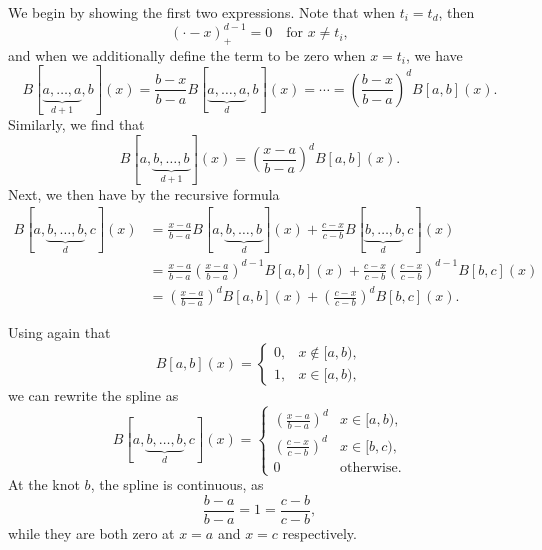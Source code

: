 \begin{solution}
    We begin by showing the first two expressions.
    Note that when $t_i = t_d$, then
    \begin{equation*}
        [t_i, \ldots, t_d](\cdot - x)_+^{d-1} = 0 \quad \text{for } x \neq t_i,
    \end{equation*}
    and when we additionally define the term to be zero when $x = t_i$, we have
    \begin{equation*}
        B[\underbrace{a, \ldots, a}_{d+1}, b](x) = \frac{b - x}{b - a} B[\underbrace{a, \ldots, a}_{d}, b](x) = \cdots =
        \left(\frac{b - x}{b - a}\right)^d B[a, b](x).
    \end{equation*}
    Similarly, we find that
    \begin{equation*}
        B[a, \underbrace{b, \ldots, b}_{d+1}](x) = \left(\frac{x - a}{b - a}\right)^d B[a, b](x).
    \end{equation*}
    Next, we then have by the recursive formula
    \begin{align*}
        B[a, \underbrace{b, \ldots, b}_{d}, c](x)
        &= \frac{x - a}{b - a} B[a, \underbrace{b, \ldots, b}_{d}](x) + \frac{c - x}{c - b} B[\underbrace{b, \ldots, b}_{d}, c](x) \\
        &= \frac{x - a}{b - a} \left( \frac{x - a}{b - a} \right)^{d-1} B[a, b](x) + \frac{c - x}{c - b} \left( \frac{c - x}{c - b} \right)^{d-1} B[b, c](x) \\
        &= \left(\frac{x - a}{b - a}\right)^{d} B[a, b](x) + \left(\frac{c - x}{c - b}\right)^{d} B[b, c](x).
    \end{align*}

    Using again that
    \begin{equation*}
        B[a, b](x) =
        \begin{cases}
            0, & x \notin [a, b), \\ %
            1, & x \in [a, b), %
        \end{cases}
    \end{equation*}
    we can rewrite the spline as
    \begin{equation*}
        B[a, \underbrace{b, \ldots, b}_{d}, c](x) =
        \begin{cases}
            \left( \frac{x - a}{b - a} \right)^d & x \in [a, b), \\ %
            \left( \frac{c - x}{c - b} \right)^{d} & x \in [b, c), \\ %
            0 & \text{otherwise}.
        \end{cases}
    \end{equation*}
    At the knot $b$, the spline is continuous, as
    \begin{equation*}
        \frac{b - a}{b - a} = 1 = \frac{c - b}{c - b},
    \end{equation*}
    while they are both zero at $x = a$ and $x = c$ respectively.
\end{solution}


